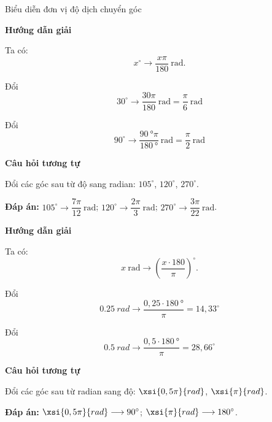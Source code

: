 \begin{dang}{Biểu diễn đơn vị độ dịch chuyển góc}
	{	\begin{center}
			\textbf{Hướng dẫn giải}
		\end{center}
		
		Ta có:
		$$x^\circ \longrightarrow \dfrac{x \pi}{180}\ \text{rad}.$$
		
		Đổi $$30^\circ \longrightarrow \dfrac{30\pi}{180}\ \text{rad} = \dfrac{\pi}{6}\ \text{rad}$$
		
		Đổi $$90^\circ \longrightarrow \dfrac{\SI{90}{\degree}\pi}{\SI{180}{\degree}}\ \text{rad} = \dfrac{\pi}{2}\ \text{rad}$$
		
		\begin{center}
			\textbf{Câu hỏi tương tự}
		\end{center}
		
		Đổi các góc sau từ độ sang radian: $105^\circ$, $120^\circ$, $270^\circ$.
		
		\textbf{Đáp án:} $105^\circ \longrightarrow \dfrac{7\pi}{12}\ \text{rad}$; $120^\circ \longrightarrow \dfrac{2\pi}{3}\ \text{rad}$; $270^\circ \longrightarrow \dfrac{3\pi}{22}\ \text{rad}$.
	}
	{	\begin{center}
			\textbf{Hướng dẫn giải}
		\end{center}
		
		Ta có:
		$$x\ \text{rad} \longrightarrow \left(\dfrac{x \cdot 180}{\pi}\right)^\circ.$$
		
		Đổi $$\SI{0.25}{rad} \longrightarrow \dfrac{0,25 \cdot \SI{180}{\degree}}{\pi} = 14,33^\circ$$
		
		Đổi $$\SI{0.5}{rad} \longrightarrow \dfrac{0,5 \cdot \SI{180}{\degree}}{\pi} = 28,66^\circ$$
		
		\begin{center}
			\textbf{Câu hỏi tương tự}
		\end{center}
		
		Đổi các góc sau từ radian sang độ: $\xsi{0,5\pi}{rad}$, $\xsi{\pi}{rad}$.
		
		\textbf{Đáp án:} $\xsi{0,5\pi}{rad} \longrightarrow 90^\circ$; $\xsi{\pi}{rad} \longrightarrow 180^\circ$.
	}
\end{dang}
